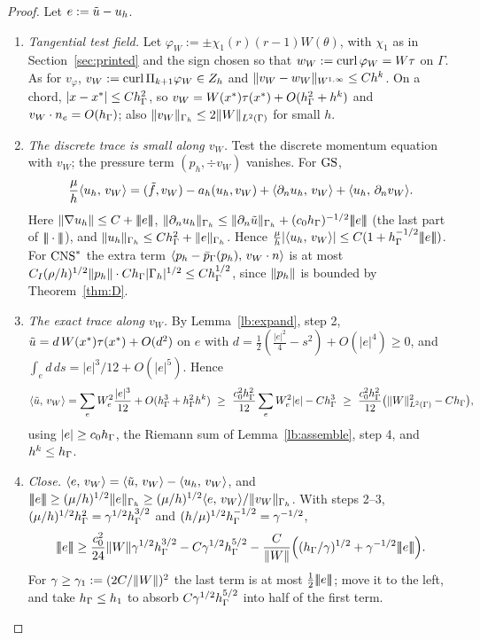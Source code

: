 \begin{proof}
Let $e:=\tilde u-u_h$.
\begin{enumerate}
\item \emph{Tangential test field.} Let $\varphi_W:=\pm\chi_1(r)(r-1)W(\theta)$, with $\chi_1$ as in Section~\ref{sec:printed} and the sign chosen so that $w_W:=\operatorname{curl}\varphi_W=W\tau$ on $\Gamma$. As for $v_\varphi$, $v_W:=\operatorname{curl}\Pi_{k+1}\varphi_W\in Z_h$ and $\lVert v_W-w_W\rVert_{W^{1,\infty}}\le Ch^k$. On a chord, $|x-x^\ast|\le Ch_\Gamma^2$, so $v_W=W(x^\ast)\tau(x^\ast)+O(h_\Gamma^2+h^k)$ and $v_W\cdot n_e=O(h_\Gamma)$; also $\lVert v_W\rVert_{\Gamma_h}\le2\lVert W\rVert_{L^2(\Gamma)}$ for small $h$.
\item \emph{The discrete trace is small along $v_W$.} Test the discrete momentum equation with $v_W$; the pressure term $(p_h,\div v_W)$ vanishes. For $\mathrm{GS}$,
\[
\frac\mu h\langle u_h,\, v_W\rangle=(\tilde f,v_W)-a_h(u_h,v_W)+\langle \partial_n u_h,\, v_W\rangle+\langle u_h,\, \partial_n v_W\rangle .
\]
Here $\lVert \nabla u_h\rVert\le C+|\!|\!|e|\!|\!|$, $\lVert \partial_n u_h\rVert_{\Gamma_h}\le\lVert \partial_n\tilde u\rVert_{\Gamma_h}+(c_0h_\Gamma)^{-1/2}|\!|\!|e|\!|\!|$ (the last part of $|\!|\!|\cdot|\!|\!|$), and $\lVert u_h\rVert_{\Gamma_h}\le Ch_\Gamma^2+\lVert e\rVert_{\Gamma_h}$. Hence $\frac\mu h|\langle u_h,\, v_W\rangle|\le C(1+h_\Gamma^{-1/2}|\!|\!|e|\!|\!|)$. For $\mathrm{CNS}^\ast$ the extra term $\langle p_h-\bar p_{\Gamma}(p_h),\, v_W\cdot n\rangle$ is at most $C_I(\rho/h)^{1/2}\lVert p_h\rVert\cdot Ch_\Gamma|\Gamma_h|^{1/2}\le Ch_\Gamma^{1/2}$, since $\lVert p_h\rVert$ is bounded by Theorem~\ref{thm:D}.
\item \emph{The exact trace along $v_W$.} By Lemma~\ref{lb:expand}, step 2, $\tilde u=d\,W(x^\ast)\tau(x^\ast)+O(d^2)$ on $e$ with $d=\frac12(\frac{|e|^2}4-s^2)+O(|e|^4)\ge0$, and $\int_ed\,ds=|e|^3/12+O(|e|^5)$. Hence
\[
\ip{\ut}{v_W}=\sum_{e}W_e^2\frac{|e|^3}{12}+O(\hG^3+\hG^2h^k)\ \ge\ \frac{c_0^2\hG^2}{12}\sum_eW_e^2|e|-C\hG^3\ \ge\ \frac{c_0^2\hG^2}{12}\bigl(\norm W^2_{L^2(\Gamma)}-C\hG\bigr),
\]
using $|e|\ge c_0h_\Gamma$, the Riemann sum of Lemma~\ref{lb:assemble}, step 4, and $h^k\le h_\Gamma$.
\item \emph{Close.} $\langle e,\, v_W\rangle=\langle \tilde u,\, v_W\rangle-\langle u_h,\, v_W\rangle$, and $|\!|\!|e|\!|\!|\ge(\mu/h)^{1/2}\lVert e\rVert_{\Gamma_h}\ge(\mu/h)^{1/2}\langle e,\, v_W\rangle/\lVert v_W\rVert_{\Gamma_h}$. With steps 2--3, $(\mu/h)^{1/2}h_\Gamma^2=\gamma^{1/2}h_\Gamma^{3/2}$ and $(h/\mu)^{1/2}h_\Gamma^{-1/2}=\gamma^{-1/2}$,
\[
\tnorm e\ge\frac{c_0^2}{24}\norm W\gamma^{1/2}\hG^{3/2}-C\gamma^{1/2}\hG^{5/2}-\frac{C}{\norm W}\Bigl((\hG/\gamma)^{1/2}+\gamma^{-1/2}\tnorm e\Bigr).
\]
For $\gamma\ge\gamma_1:=(2C/\lVert W\rVert)^2$ the last term is at most $\frac12|\!|\!|e|\!|\!|$; move it to the left, and take $h_\Gamma\le h_1$ to absorb $C\gamma^{1/2}h_\Gamma^{5/2}$ into half of the first term.\qedhere
\end{enumerate}
\end{proof}

